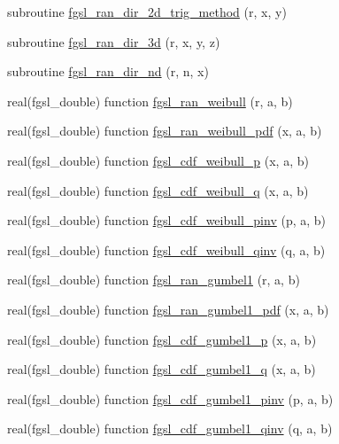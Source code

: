 \begin{DoxyCompactItemize}
\item 
subroutine \hyperlink{rng_8finc_aad06ec726757689953f49b72533502bc}{fgsl\+\_\+ran\+\_\+dir\+\_\+2d\+\_\+trig\+\_\+method} (r, x, y)
\item 
subroutine \hyperlink{rng_8finc_a76b76d07af9c338b59841a300b1fe713}{fgsl\+\_\+ran\+\_\+dir\+\_\+3d} (r, x, y, z)
\item 
subroutine \hyperlink{rng_8finc_a630c7e86d20d111e9e2257c3ca4d3099}{fgsl\+\_\+ran\+\_\+dir\+\_\+nd} (r, n, x)
\item 
real(fgsl\+\_\+double) function \hyperlink{rng_8finc_a2ae4b421d515bf870ec49f005f1004b9}{fgsl\+\_\+ran\+\_\+weibull} (r, a, b)
\item 
real(fgsl\+\_\+double) function \hyperlink{rng_8finc_afe0ac6dc4d46f4844d0fec31f55db2b4}{fgsl\+\_\+ran\+\_\+weibull\+\_\+pdf} (x, a, b)
\item 
real(fgsl\+\_\+double) function \hyperlink{rng_8finc_aac992deb1d7934dace804f0d289463d8}{fgsl\+\_\+cdf\+\_\+weibull\+\_\+p} (x, a, b)
\item 
real(fgsl\+\_\+double) function \hyperlink{rng_8finc_a195b5d5a03a5b2a91dad73d8057333d9}{fgsl\+\_\+cdf\+\_\+weibull\+\_\+q} (x, a, b)
\item 
real(fgsl\+\_\+double) function \hyperlink{rng_8finc_ab388789e3098acaaf9f3cee993b6d442}{fgsl\+\_\+cdf\+\_\+weibull\+\_\+pinv} (p, a, b)
\item 
real(fgsl\+\_\+double) function \hyperlink{rng_8finc_a5114adcd286e64034c0959254212047b}{fgsl\+\_\+cdf\+\_\+weibull\+\_\+qinv} (q, a, b)
\item 
real(fgsl\+\_\+double) function \hyperlink{rng_8finc_ae340600957508ade0da2ca0078720d6a}{fgsl\+\_\+ran\+\_\+gumbel1} (r, a, b)
\item 
real(fgsl\+\_\+double) function \hyperlink{rng_8finc_a7d4cb752dabe9a68cd165e6b717f487b}{fgsl\+\_\+ran\+\_\+gumbel1\+\_\+pdf} (x, a, b)
\item 
real(fgsl\+\_\+double) function \hyperlink{rng_8finc_aa1f725735b86da6477ee1e6e7f23be25}{fgsl\+\_\+cdf\+\_\+gumbel1\+\_\+p} (x, a, b)
\item 
real(fgsl\+\_\+double) function \hyperlink{rng_8finc_a7ee83d5fc3ce8f58396b8fb373d3c3e6}{fgsl\+\_\+cdf\+\_\+gumbel1\+\_\+q} (x, a, b)
\item 
real(fgsl\+\_\+double) function \hyperlink{rng_8finc_a6da83025c6b0132f69e09cc2681507ca}{fgsl\+\_\+cdf\+\_\+gumbel1\+\_\+pinv} (p, a, b)
\item 
real(fgsl\+\_\+double) function \hyperlink{rng_8finc_af40fcfa8cf59b40ac3cb704ba9d38963}{fgsl\+\_\+cdf\+\_\+gumbel1\+\_\+qinv} (q, a, b)

\end{DoxyCompactItemize}
